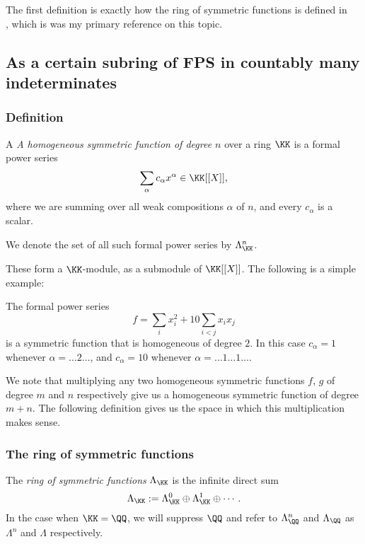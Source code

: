\documentclass{article}
\begin{document}
The first definition is exactly how the ring of symmetric functions is defined in \\
\cite{StanleyEC2}, which is was my primary reference on this topic.

\subsection{As a certain subring of FPS in countably many indeterminates}

\subsubsection{Definition}

\begin{definition}
    A \textit{A homogeneous symmetric function of degree $n$} over a ring $\KK$ is a formal power series
    \[
        \sum_\alpha c_\alpha x^\alpha \in \KK[[X]],
    \]
    where we are summing over all weak compositions $\alpha$ of $n$, and every $c_\alpha$ is a scalar.
    
    We denote the set of all such formal power series by $\Lambda_\KK^n$.
\end{definition}

These form a $\KK$-module, as a submodule of $\KK[[X]]$. 
The following is a simple example:

\begin{example}
    The formal power series 
    \[
        f = \sum_i x_i^2 + 10\sum_{i < j} x_ix_j
    \]
    is a symmetric function that is homogeneous of degree $2$. In this case $c_\alpha = 1$ whenever $\alpha = \ldots 2 \ldots$, and $c_\alpha = 10$ whenever $\alpha = \ldots 1 \ldots 1 \ldots$. 
\end{example}


We note that multiplying any two homogeneous symmetric functions $f$, $g$ of degree $m$ and $n$ respectively give us a homogeneous symmetric function of degree $m+n$.
The following definition gives us the space in which this multiplication makes sense.

\subsubsection{The ring of symmetric functions}

\begin{definition}
    The \textit{ring of symmetric functions} $\Lambda_\KK$ is the infinite direct sum
    \[
        \Lambda_\KK := \Lambda_\KK^0 \oplus\Lambda_\KK^1 \oplus \cdots.
    \]
    In the case when $\KK = \QQ$, we will suppress $\QQ$ and refer to $\Lambda_\QQ^n$ and $\Lambda_\QQ$ as $\Lambda^n$ and $\Lambda$ respectively.
\end{definition}
\end{document}
